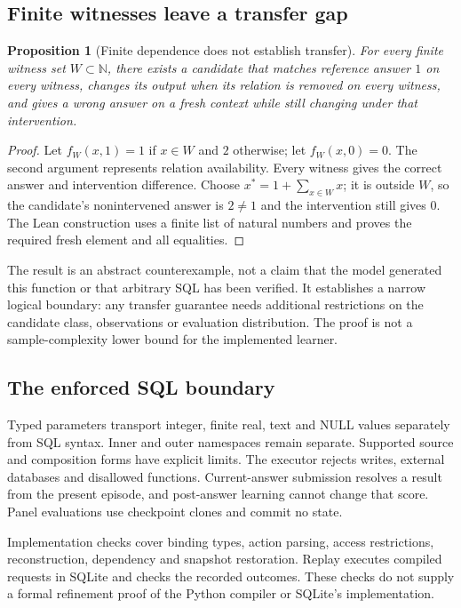\documentclass[10pt,twocolumn]{article}
\newtheorem{proposition}{Proposition}
\begin{document}
\subsection{Finite witnesses leave a transfer gap}
\setcounter{proposition}{1}
\begin{proposition}[Finite dependence does not establish transfer]\label{prop:finite}
For every finite witness set $W\subset\mathbb N$, there exists a candidate that
matches reference answer $1$ on every witness, changes its output when its
relation is removed on every witness, and gives a wrong answer on a fresh
context while still changing under that intervention.
\end{proposition}
\begin{proof}
Let $f_W(x,1)=1$ if $x\in W$ and $2$ otherwise; let $f_W(x,0)=0$.
The second argument represents relation availability. Every witness gives the
correct answer and intervention difference. Choose
$x^*=1+\sum_{x\in W}x$; it is outside $W$, so the candidate's nonintervened
answer is $2\ne1$
and the intervention still gives $0$. The Lean construction uses a finite list
of natural numbers and proves the required fresh element and all equalities.
\end{proof}

The result is an abstract counterexample, not a claim that the model generated
this function or that arbitrary SQL has been verified. It establishes a narrow
logical boundary: any transfer guarantee needs additional restrictions on the
candidate class, observations or evaluation distribution. The proof is not a
sample-complexity lower bound for the implemented learner.


\subsection{The enforced SQL boundary}
Typed parameters transport integer, finite real, text and NULL values separately
from SQL syntax. Inner and outer namespaces remain separate. Supported source
and composition forms have explicit limits. The executor rejects writes,
external databases and disallowed functions. Current-answer submission resolves
a result from the present episode, and post-answer learning cannot change that
score. Panel evaluations use checkpoint clones and commit no state.

Implementation checks cover binding types, action parsing, access restrictions,
reconstruction, dependency and snapshot restoration. Replay executes compiled
requests in SQLite and checks the recorded outcomes. These checks do not supply
a formal refinement proof of the Python compiler or SQLite's implementation.
\end{document}
